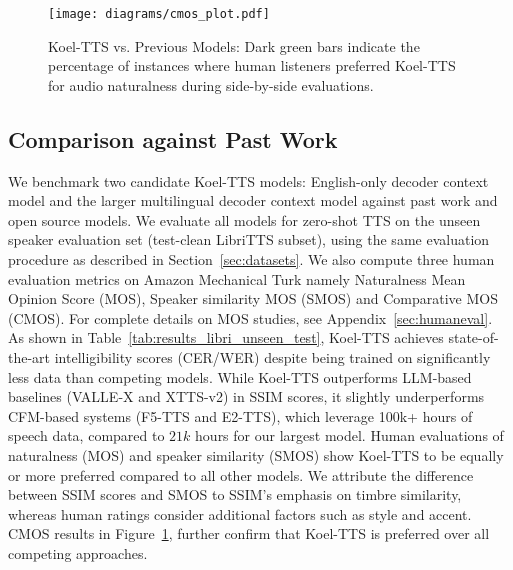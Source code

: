 \begin{figure}[!ht]
    \centering
    \texttt{[image: diagrams/cmos\_plot.pdf]}
    \vspace{-8mm} 
    \caption{\footnotesize{Koel-TTS vs. Previous Models: Dark green bars indicate the percentage of instances where human listeners preferred Koel-TTS for audio naturalness during side-by-side evaluations.}}
    \label{figs:cmosplot}
     \vspace{-4mm} 
\end{figure}


\subsection{Comparison against Past Work}
\label{sec:pastworkcomparison}
We benchmark two candidate Koel-TTS models: English-only decoder context model and the larger multilingual decoder context model against past work and open source models. We evaluate all models for zero-shot TTS on the unseen speaker evaluation set (test-clean LibriTTS subset), using the same evaluation procedure as described in Section~\ref{sec:datasets}.
We also compute three human evaluation metrics on Amazon Mechanical Turk namely Naturalness Mean Opinion Score (MOS), Speaker similarity MOS (SMOS) and Comparative MOS (CMOS). For complete details on MOS studies, see Appendix~\ref{sec:humaneval}. 
As shown in Table~\ref{tab:results_libri_unseen_test}, Koel-TTS achieves state-of-the-art intelligibility scores (CER/WER) despite being trained on significantly less data than competing models. While Koel-TTS outperforms LLM-based baselines (VALLE-X and XTTS-v2) in SSIM scores, it slightly underperforms CFM-based systems (F5-TTS and E2-TTS), which leverage 100k+ hours of speech data, compared to $21k$ hours for our largest model. Human evaluations of naturalness (MOS) and speaker similarity (SMOS) 
show Koel-TTS to be equally or more preferred compared to all other models. We attribute the difference between SSIM scores and SMOS to SSIM’s emphasis on timbre similarity, whereas human ratings consider additional factors such as style and accent. CMOS results in Figure~\ref{figs:cmosplot}, further confirm that Koel-TTS is preferred over all competing approaches.


